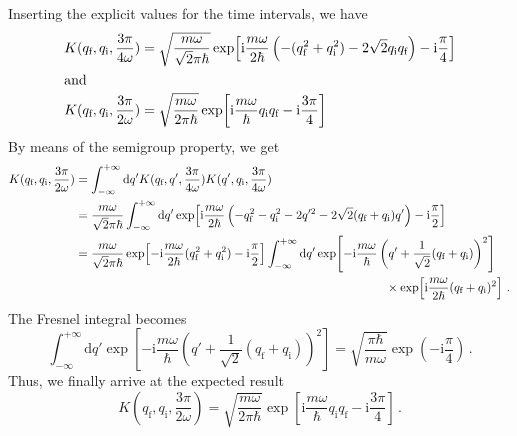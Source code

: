 \documentclass[11pt,DIV=19,parskip=half]{scrartcl}
\begin{document}
Inserting the explicit values for the time intervals, we have
\begin{align}
 K(q_\text{f}, q_\text{i}, \frac{3\pi}{4\omega})
      &= \sqrt{\frac{m\omega}{\sqrt{2}\pi\hbar}}
         \exp\!\left[\text{i}\frac{m\omega}{2\hbar}\left(-(q_\text{f}^2+q_\text{i}^2)
         -2\sqrt{2}q_\text{i}q_\text{f}\right)-\text{i}\frac{\pi}{4}\right]\\
\intertext{and}
 K(q_\text{f}, q_\text{i}, \frac{3\pi}{2\omega})
      &= \sqrt{\frac{m\omega}{2\pi\hbar}}
         \exp\!\left[\text{i}\frac{m\omega}{\hbar}q_\text{i}q_\text{f}-\text{i}\frac{3\pi}{4}\right]
\end{align}
By means of the semigroup property, we get
\begin{equation}
 \begin{aligned}
  K(q_\text{f}, q_\text{i}, \frac{3\pi}{2\omega}) &= \int_{-\infty}^{+\infty}\text{d}q'
                K(q_\text{f}, q', \frac{3\pi}{4\omega}) K(q', q_\text{i}, \frac{3\pi}{4\omega})\\
   &= \frac{m\omega}{\sqrt{2}\pi\hbar} \int_{-\infty}^{+\infty}\text{d}q'
         \exp\!\left[\text{i}\frac{m\omega}{2\hbar}\left(-q_\text{f}^2-q_\text{i}^2-2q'^2
                        -2\sqrt{2}(q_\text{f}+q_\text{i})q'\right)-\text{i}\frac{\pi}{2}\right]\\
   &= \frac{m\omega}{\sqrt{2}\pi\hbar} 
         \exp\!\left[-\text{i}\frac{m\omega}{2\hbar}(q_\text{f}^2+q_\text{i}^2)-\text{i}\frac{\pi}{2}\right]
         \int_{-\infty}^{+\infty}\text{d}q'
         \exp\!\left[-\text{i}\frac{m\omega}{\hbar}
                 \left(q'+\frac{1}{\sqrt{2}}(q_\text{f}+q_\text{i})\right)^2\right]\\
   &\hspace{9truecm}\times\exp\!\left[\text{i}\frac{m\omega}{2\hbar}(q_\text{f}+q_\text{i})^2\right]\,.
 \end{aligned}
\end{equation}
The Fresnel integral becomes
\begin{equation}
 \int_{-\infty}^{+\infty}\text{d}q'\exp\!\left[-\text{i}\frac{m\omega}{\hbar}
      \left(q'+\frac{1}{\sqrt{2}}(q_\text{f}+q_\text{i})\right)^2\right]
 = \sqrt{\frac{\pi\hbar}{m\omega}}\exp\!\left(-\text{i}\frac{\pi}{4}\right)\,.
\end{equation}
Thus, we finally arrive at the expected result
\begin{equation}
 K(q_\text{f}, q_\text{i}, \frac{3\pi}{2\omega}) = \sqrt{\frac{m\omega}{2\pi\hbar}}
         \exp\!\left[\text{i}\frac{m\omega}{\hbar}q_\text{i}q_\text{f}-\text{i}\frac{3\pi}{4}\right]\,.
\end{equation}
\end{document}
